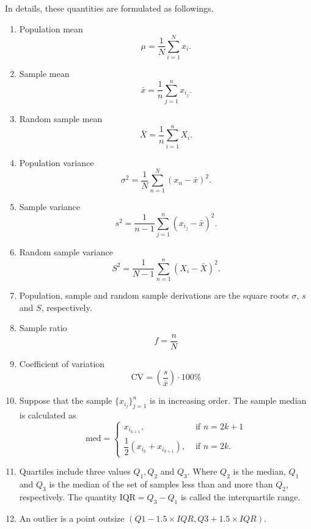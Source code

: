 In details, these quantities are formulated as followings.
\begin{enumerate}
 \item Population mean
       \begin{equation}
        \mu = \frac{1}{N} \sum_{i=1}^N x_i.
       \end{equation}
 \item Sample mean
       \begin{equation}
        \bar{x} = \frac{1}{n} \sum_{j=1}^n x_{i_j}.
       \end{equation}
 \item Random sample mean
       \begin{equation}
        \bar{X} = \frac{1}{n} \sum_{i=1}^n X_i.
       \end{equation}
 \item Population variance
       \begin{equation}
        \sigma^2 = \dfrac{1}{N} \sum_{n=1}^N (x_n - \bar{x})^2.
       \end{equation}
 \item Sample variance
       \begin{equation}
        s^2 = \dfrac{1}{n-1} \sum_{j=1}^n (x_{i_j} - \bar{x})^2.
       \end{equation}
 \item Random sample variance
       \begin{equation}
        S^2 = \dfrac{1}{N-1} \sum_{n=1}^n (X_i - \bar{X})^2.
       \end{equation}
 \item Population, sample and random sample derivations are the square roots $\sigma$, $s$ and $S$, respectively.

 \item Sample ratio
       \begin{equation}
        f = \dfrac{n}{N}
       \end{equation}
 \item Coefficient of variation
       \begin{equation}
        \mathrm{CV} = \left(\frac{s}{\bar{x}}\right) \cdot 100\%
       \end{equation}
 \item Suppose that the sample $\{x_{i_j}\}_{j=1}^n$ is in increasing order. The sample median is calculated as
       \begin{equation}
        \mathrm{med} = \begin{cases}
         x_{i_{k+1}},                            & \text{ if } n = 2k+1 \\
         \dfrac{1}{2} (x_{i_{k}} + x_{i_{k+1}}), & \text{ if } n = 2k.
        \end{cases}
       \end{equation}
 \item Quartiles include three values $Q_1,Q_2$ and $Q_3$. Where $Q_2$ is the median, $Q_1$ and $Q_3$ is the median of the set of samples less than and more than $Q_2$, respectively. The quantity $\mathrm{IQR} = Q_3-Q_1$ is called the interquartile range.
 \item An outlier is a point outsize $(Q1 - 1.5 \times IQR, Q3 + 1.5 \times IQR)$.
\end{enumerate}

